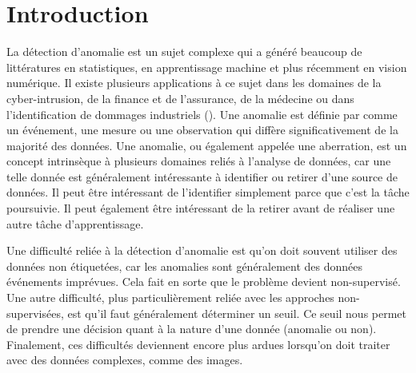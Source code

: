 \chapter*{Introduction}         %
\label{chap:introduction}       %


La détection d'anomalie est un sujet complexe qui a généré beaucoup de littératures en statistiques,  en apprentissage machine et plus récemment en vision numérique. Il existe plusieurs applications à ce sujet dans les domaines de la cyber-intrusion, de la finance et de l'assurance, de la médecine ou dans l'identification de dommages industriels (\cite{Chandola07anomalydetection:}). Une anomalie est définie par \cite{Zimek2017} comme un événement, une mesure ou une observation qui diffère significativement de la majorité des données. Une anomalie, ou également appelée une aberration, est un concept intrinsèque à plusieurs domaines reliés à l'analyse de données, car une telle donnée est généralement intéressante à identifier ou retirer d'une source de données. Il peut être intéressant de l'identifier simplement parce que c'est  la tâche poursuivie. Il peut également être intéressant de la retirer avant de réaliser une autre tâche d'apprentissage. \newline

Une difficulté reliée à la détection d'anomalie est qu'on doit souvent utiliser des données non étiquetées, car les anomalies sont généralement des données événements imprévues. Cela fait en sorte que le problème devient non-supervisé. Une autre difficulté, plus particulièrement reliée avec les approches non-supervisées, est qu'il faut généralement déterminer un seuil. Ce seuil nous permet de prendre une décision quant à la nature d'une donnée (anomalie ou non). Finalement, ces difficultés deviennent encore plus ardues lorsqu'on doit traiter avec des données complexes, comme des images. \newline

